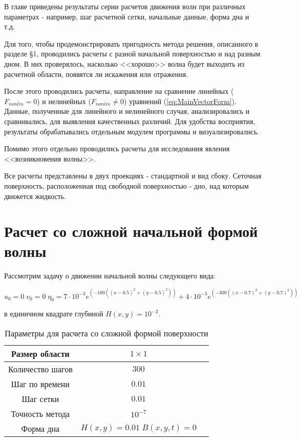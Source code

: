 В главе приведены результаты серии расчетов движения волн при различных  параметрах - например, шаг расчетной сетки, начальные данные, форма дна и т.д.

Для того, чтобы продемонстрировать пригодность метода решения, описанного в разделе \S1, проводились расчеты с разной начальной поверхностью и над разным дном. В них проверялось, насколько <<хорошо>> волна будет выходить из расчетной области, появятся ли искажения или отражения.

После этого проводились расчеты, направление на сравнение линейных ($F_{nonlin}=0$) и нелинейных ($F_{nonlin}\neq 0$) уравнений (\ref{eq:MainVectorForm}). Данные, полученные для линейного и нелинейного случая, анализировались и сравнивались, для выявления качественных различий. Для удобства восприятия, результаты обрабатывались отдельным модулем программы и визуализировались.

Помимо этого отдельно проводились расчеты для исследования явления <<возникновения волны>>.

Все расчеты представлены в двух проекциях - стандартной и вид сбоку. Сеточная поверхность, расположенная под свободной поверхностью - дно, над которым движется жидкость.

\newpage
\addtocounter{section}{1}
\setcounter{equation}{0}
\setcounter{subsection}{0}
\section*{Расчет со сложной начальной формой волны} 

Рассмотрим задачу о движении начальной волны следующего вида:

$u_0=0\;v_0=0\;\eta_0=7 \cdot 10^{-3}e^{(-100 ((x-0.5)^2+(y-0.5)^2))}+4 \cdot 10^{-3}e^{(-300 ((x-0.7)^2+(y-0.7)^2))}$

в единичном квадрате глубиной $H(x,y)=10^{-2}$.

\begin{table}[H]
    \label{tab:FirstResult}
    \caption{Параметры для расчета со сложной формой поверхности}
    \begin{center}
	\begin{tabular}{|c|c|c|}
	    \hline
	    Размер области & $1\times1$\\
	    \hline
	    Количество шагов & $300$\\
	    \hline
	    Шаг по времени & $0.01$\\
	    \hline
	    Шаг сетки & $0.01$\\
	    \hline
	    Точность метода & $10^{-7}$\\
	    \hline
	    Форма дна & $H(x,y)=0.01\; B(x,y,t)=0$\\
	    \hline
	\end{tabular}
    \end{center}
\end{table}

